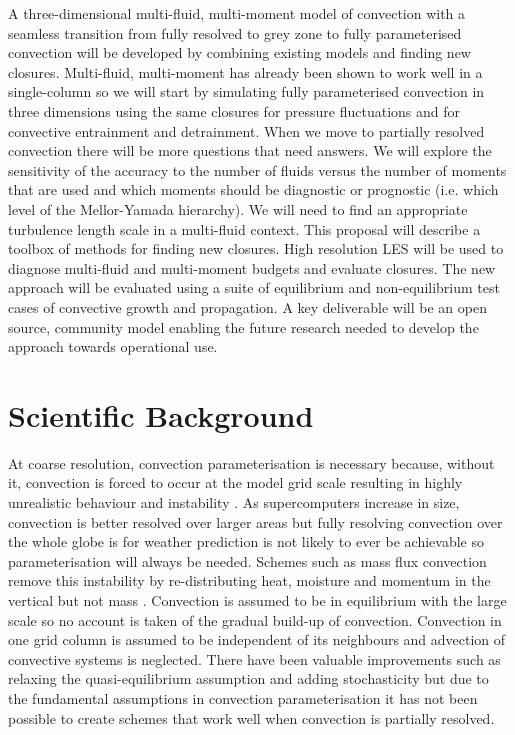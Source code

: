 \documentclass[11pt,a4paper]{article}
\begin{document}
A three-dimensional multi-fluid, multi-moment model of convection with a seamless transition from fully resolved to grey zone to fully parameterised convection will be developed by combining existing models and finding new closures. Multi-fluid, multi-moment has already been shown to work well in a single-column so we will start by simulating fully parameterised convection in three dimensions using the same closures for pressure fluctuations and for convective entrainment and detrainment. When we move to partially resolved convection there will be more questions that need answers. We will explore the sensitivity of the accuracy to the number of fluids versus the number of moments that are used and which moments should be diagnostic or prognostic (i.e. which level of the Mellor-Yamada hierarchy). We will need to find an appropriate turbulence length scale in a multi-fluid context. This proposal will describe a toolbox of methods for finding new closures. High resolution LES will be used to diagnose multi-fluid and multi-moment budgets and evaluate closures. The new approach will be evaluated using a suite of equilibrium and non-equilibrium test cases of convective growth and propagation. A key deliverable will be an open source, community model enabling the future research needed to develop the approach towards operational use.

\section{Scientific Background}

At coarse resolution, convection parameterisation is necessary because, without it, convection is forced to occur at the model grid scale resulting in highly unrealistic behaviour and instability \cite[]{PY15}.
As supercomputers increase in size, convection is better resolved over larger areas \cite[e.g.][]{GC17} but fully resolving convection over the whole globe is for weather prediction is not likely to ever be achievable \cite[e.g.][]{SSJ+19} so parameterisation will always be needed. 
Schemes such as mass flux convection remove this instability by re-distributing heat, moisture and momentum in the vertical but not mass \cite[]{Tied89,GR90}. Convection is assumed to be in equilibrium with the large scale so no account is taken of the gradual build-up of convection. Convection in one grid column is assumed to be independent of its neighbours and advection of convective systems is neglected. There have been valuable improvements such as relaxing the quasi-equilibrium assumption \cite[]{PR98,GG05,Par14} and adding stochasticity \cite[]{PC08} but due to the fundamental assumptions in convection parameterisation it has not been possible to create schemes that work well when convection is partially resolved.
\end{document}
